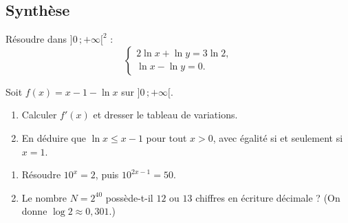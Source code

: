 \subsection{Synthèse}

Résoudre dans $]0\,;+\infty[^{2}$ :
\[
\begin{cases}
	2\ln x+\ln y=3\ln 2,\\[0.3em]
	\ln x-\ln y=0.
\end{cases}
\]

Soit $f(x)=x-1-\ln x$ sur $]0\,;+\infty[$.
\begin{enumerate}
	\item Calculer $f'(x)$ et dresser le tableau de variations.
	\item En déduire que $\ln x\leq x-1$ pour tout $x>0$, avec égalité si et
	seulement si $x=1$.
\end{enumerate}

\begin{enumerate}
	\item Résoudre $10^{x}=2$, puis $10^{2x-1}=50$.
	\item Le nombre $N=2^{40}$ possède-t-il $12$ ou $13$ chiffres en écriture
	décimale ? (On donne $\log 2\approx 0{,}301$.)
\end{enumerate}
